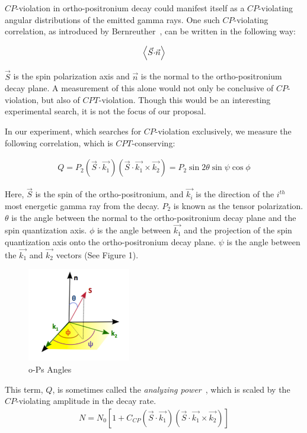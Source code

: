  $CP$-violation in ortho-positronium decay could manifest itself as a $CP$-violating angular distributions of the emitted gamma rays. One such $CP$-violating correlation, as introduced by Bernreuther~\cite{Bernreuther:1981ah}, can be written in the following way:

 \begin{align}
 \Braket{\vec{S}{\cdot}\vec{n}}
 \end{align}

 $\vec{S}$ is the spin polarization axis and $\vec{n}$ is the normal to the ortho-positronium decay plane. A measurement of this alone would not only be conclusive of $CP$-violation, but also of $CPT$-violation. Though this would be an interesting experimental search, it is not the focus of our proposal.

 In our experiment, which searches for $CP$-violation exclusively, we measure the following correlation, which is $CPT$-conserving:

 \begin{align}
 Q=P_{2}(\vec{S}{\cdot}\vec{k_{1}})(\vec{S}{\cdot}\vec{k_{1}}{\times}\vec{k_{2}})=P_{2}\sin{2\theta}\sin{\psi}\cos{\phi}
 \end{align}

Here, $\vec{S}$ is the spin of the ortho-positronium, and $\vec{k_{i}}$ is the direction of the $i^{th}$ most energetic gamma ray from the decay. $P_{2}$ is known as the tensor polarization. $\theta$ is the angle between the normal to the ortho-positronium decay plane and the spin quantization axis. $\phi$ is the angle between $\vec{k_{1}}$ and the projection of the spin quantization axis onto the ortho-positronium decay plane. $\psi$ is the angle between the $\vec{k_{1}}$ and $\vec{k_{2}}$ vectors (See Figure 1). 

 \begin{figure}[H]
 \includegraphics[width=0.4\textwidth,center]{spinAngles.pdf}
 \caption{o-Ps Angles}
 \end{figure}

 This term, $Q$, is sometimes called the \emph{analyzing power}~\cite{PhysRevLett.104.083401}, which is scaled by the $CP$-violating amplitude in the decay rate.
 \begin{align}
 N=N_{0}[1+C_{CP}\left(\vec{S}{\cdot}\vec{k_{1}}\right)\left(\vec{S}{\cdot}\vec{k_{1}}{\times}{\vec{k_{2}}}\right)]
 \end{align}

